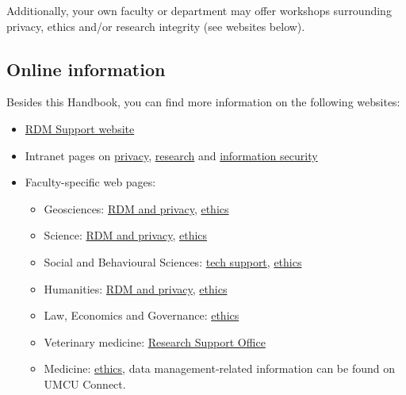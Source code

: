 \documentclass[
]{book}
\providecommand{\tightlist}{%
  \setlength{\itemsep}{0pt}\setlength{\parskip}{0pt}}
\begin{document}
Additionally, your own faculty or department may offer workshops surrounding
privacy, ethics and/or research integrity (see websites below).

\hypertarget{websites}{%
\subsection{Online information}\label{websites}}

Besides this Handbook, you can find more information on the following websites:

\begin{itemize}
\tightlist
\item
  \href{https://www.uu.nl/rdm}{RDM Support website}
\item
  Intranet pages on \href{https://intranet.uu.nl/en/knowledge-base/privacy-at-uu}{privacy},
  \href{https://intranet.uu.nl/en/knowledgebase/research}{research} and
  \href{https://intranet.uu.nl/en/information-security-at-the-uu}{information security}
\item
  Faculty-specific web pages:

  \begin{itemize}
  \tightlist
  \item
    Geosciences: \href{https://geo-data-support.sites.uu.nl/}{RDM and privacy},
    \href{https://sciencegeo-erb.sites.uu.nl/}{ethics}
  \item
    Science: \href{https://science-data-support.sites.uu.nl/}{RDM and privacy},
    \href{https://sciencegeo-erb.sites.uu.nl/}{ethics}
  \item
    Social and Behavioural Sciences: \href{https://techsupport.fss.uu.nl/}{tech support},
    \href{https://ferb.sites.uu.nl/}{ethics}
  \item
    Humanities: \href{https://cdh.uu.nl/research/data-management-privacy/}{RDM and privacy},
    \href{https://fetc-gw.wp.hum.uu.nl/}{ethics}
  \item
    Law, Economics and Governance: \href{https://intranet.uu.nl/en/knowledgebase/facultys-ethical-review-committee}{ethics}
  \item
    Veterinary medicine: \href{https://www.uu.nl/en/node/589/onderzoeksbureauresearch-support-office}{Research Support Office}
  \item
    Medicine: \href{https://www.metc-utrecht.nl/en/}{ethics}, data management-related information can be found on UMCU Connect.
  \end{itemize}
\end{itemize}
\end{document}
